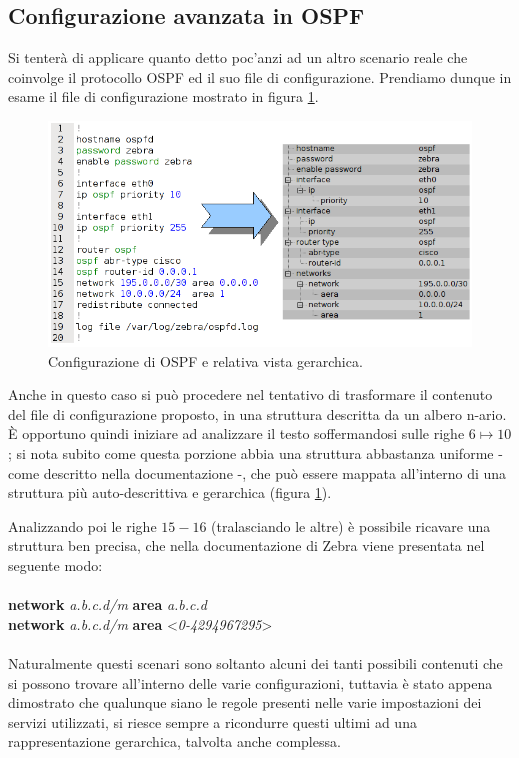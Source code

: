 \subsection{Configurazione avanzata in OSPF}
Si tenterà di applicare quanto detto poc'anzi ad un altro scenario reale che coinvolge il protocollo OSPF ed il suo file di configurazione. Prendiamo dunque in esame il file di configurazione mostrato in figura \ref{figura:ospf_conf}.

\begin{figure}[!htb]
	\centering
	\includegraphics[width=12cm]{images/ospf_conf_schema_tree.png}
	\caption{Configurazione di OSPF e relativa vista gerarchica.}
	\label{figura:ospf_conf}
\end{figure}

Anche in questo caso si può procedere nel tentativo di trasformare il contenuto del file di configurazione proposto, in una struttura descritta da un albero n-ario. È opportuno quindi iniziare ad analizzare il testo soffermandosi sulle righe $6\mapsto10$; si nota subito come questa porzione abbia una struttura abbastanza uniforme - come descritto nella documentazione\cite{ZEBRADOC} -, che può essere mappata all'interno di una struttura più auto-descrittiva e gerarchica (figura \ref{figura:ospf_conf}).

Analizzando poi le righe $15-16$ (tralasciando le altre) è possibile ricavare una struttura ben precisa, che nella documentazione di Zebra viene presentata nel seguente modo:
\\
\\
\textbf{network} \textit{a.b.c.d/m} \textbf{area} \textit{a.b.c.d}
\\
\textbf{network} \textit{a.b.c.d/m} \textbf{area} <\textit{0-4294967295}>
\\
\\
Naturalmente questi scenari sono soltanto alcuni dei tanti possibili contenuti che si possono trovare all'interno delle varie configurazioni, tuttavia è stato appena dimostrato che qualunque siano le regole presenti nelle varie impostazioni dei servizi utilizzati, si riesce sempre a ricondurre questi ultimi ad una rappresentazione gerarchica, talvolta anche complessa.

